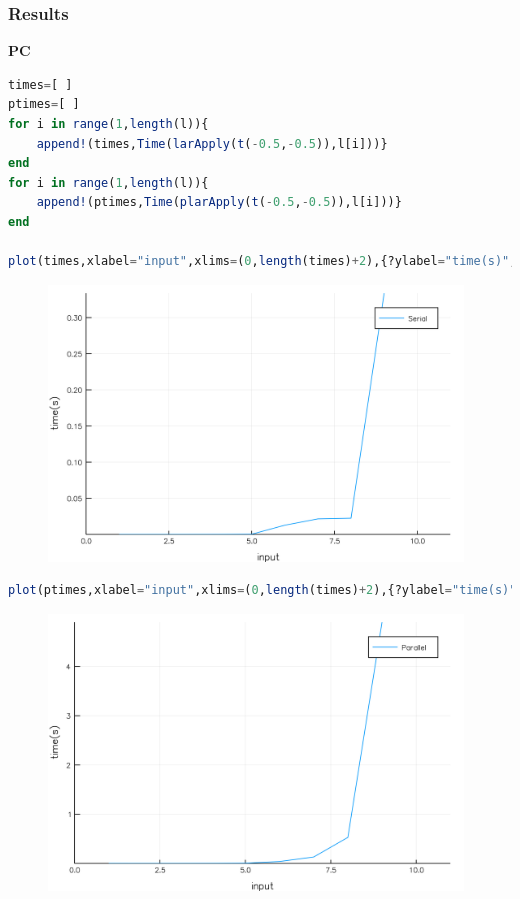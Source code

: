 \documentclass[a4paper,12pt]{article}
\begin{document}
\subsubsection{Results}
\textbf{PC}
\begin{lstlisting}[language=Julia,format=Julia]
times=[ ]
ptimes=[ ]
for i in range(1,length(l)){
    append!(times,Time(larApply(t(-0.5,-0.5)),l[i]))}
end
for i in range(1,length(l)){
    append!(ptimes,Time(plarApply(t(-0.5,-0.5)),l[i]))}
end

plot(times,xlabel="input",xlims=(0,length(times)+2),{?ylabel="time(s)",label=["Serial"])
\end{lstlisting}
\newpage
\begin{figure}[ht!]
\centering
\includegraphics[width=11cm,scale=0.3]{larApplySerial.png}
\end{figure}
\begin{lstlisting}[language=Julia,format=Julia]
plot(ptimes,xlabel="input",xlims=(0,length(times)+2),{?ylabel="time(s)",label=["Parallel"])
\end{lstlisting}
\begin{figure}[ht!]
\centering
\includegraphics[width=11cm,scale=0.3]{larApplyParallel.png}
\end{figure}
\end{document}
